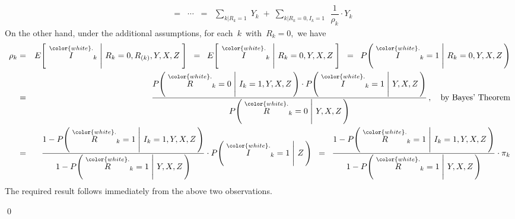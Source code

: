 \begin{enumerate}
\begin{eqnarray*}
	\;\; = \;\; \cdots \;\; = \;\;
		\underset{k\vert R_{k}=1}{\sum}\; Y_{k}
		\; + \;
		\underset{k\vert R_{k}=0,I_{k}=1}{\sum}\;\, \dfrac{1}{\rho_{k}} \cdot Y_{k}
	\end{eqnarray*}
	On the other hand, under the additional assumptions, for each \,$k$\, with \,$R_{k} = 0$,\, we have
	\begin{eqnarray*}
	\rho_{k}
	& = &
		E\!\left[\;\left.\overset{{\color{white}.}}{I}_{k}\;\right\vert\,R_{k}=0,R_{(k)},Y,X,Z\;\right]
	\;\; = \;\;
		E\!\left[\;\left.\overset{{\color{white}.}}{I}_{k}\;\right\vert\,R_{k}=0,Y,X,Z\;\right]
	\;\; = \;\;
		P\!\left(\,\left.\overset{{\color{white}.}}{I}_{k}=1\;\right\vert\,R_{k}=0,Y,X,Z\,\right)
	\\
	& = &
		\dfrac{
			P\!\left(\,\left.\overset{{\color{white}.}}{R}_{k}=0\;\right\vert\,I_{k}=1,Y,X,Z\,\right)
			\cdot
			P\!\left(\,\left.\overset{{\color{white}.}}{I}_{k}=1\;\right\vert\,Y,X,Z\,\right)
			}{
			P\!\left(\,\left.\overset{{\color{white}.}}{R}_{k}=0\;\right\vert\,Y,X,Z\,\right)
			}\,,
		\quad
		\textnormal{by Bayes' Theorem}
	\\
	& = &
		\dfrac{
			1 - P\!\left(\,\left.\overset{{\color{white}.}}{R}_{k}=1\;\right\vert\,I_{k}=1,Y,X,Z\,\right)
			}{
			1 - P\!\left(\,\left.\overset{{\color{white}.}}{R}_{k}=1\;\right\vert\,Y,X,Z\,\right)
			}
		\cdot
		P\!\left(\,\left.\overset{{\color{white}.}}{I}_{k}=1\;\right\vert\,Z\,\right)
	\;\; = \;\;
		\dfrac{
			1 - P\!\left(\,\left.\overset{{\color{white}.}}{R}_{k}=1\;\right\vert\,I_{k}=1,Y,X,Z\,\right)
			}{
			1 - P\!\left(\,\left.\overset{{\color{white}.}}{R}_{k}=1\;\right\vert\,Y,X,Z\,\right)
			}
		\cdot
		\pi_{k}
	\end{eqnarray*}
	The required result follows immediately from the above two observations.
\end{enumerate}
\qed



\renewcommand{\theenumi}{\roman{enumi}}
\renewcommand{\labelenumi}{\textnormal{(\theenumi)}$\;\;$}


